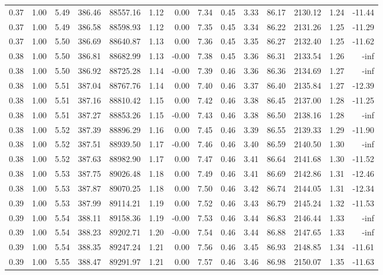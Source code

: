 \begin{table}[!ht]
\begin{tabular}{rrrrrrrrrrrrrr}
0.37 & 1.00 & 5.49 & 386.46 & 88557.16 & 1.12 & 0.00 & 7.34 & 0.45 & 3.33 & 86.17 & 2130.12 & 1.24 & -11.44 \\
0.37 & 1.00 & 5.49 & 386.58 & 88598.93 & 1.12 & 0.00 & 7.35 & 0.45 & 3.34 & 86.22 & 2131.26 & 1.25 & -11.29 \\
0.37 & 1.00 & 5.50 & 386.69 & 88640.87 & 1.13 & 0.00 & 7.36 & 0.45 & 3.35 & 86.27 & 2132.40 & 1.25 & -11.62 \\
0.38 & 1.00 & 5.50 & 386.81 & 88682.99 & 1.13 & -0.00 & 7.38 & 0.45 & 3.36 & 86.31 & 2133.54 & 1.26 & -inf \\
0.38 & 1.00 & 5.50 & 386.92 & 88725.28 & 1.14 & -0.00 & 7.39 & 0.46 & 3.36 & 86.36 & 2134.69 & 1.27 & -inf \\
0.38 & 1.00 & 5.51 & 387.04 & 88767.76 & 1.14 & 0.00 & 7.40 & 0.46 & 3.37 & 86.40 & 2135.84 & 1.27 & -12.39 \\
0.38 & 1.00 & 5.51 & 387.16 & 88810.42 & 1.15 & 0.00 & 7.42 & 0.46 & 3.38 & 86.45 & 2137.00 & 1.28 & -11.25 \\
0.38 & 1.00 & 5.51 & 387.27 & 88853.26 & 1.15 & -0.00 & 7.43 & 0.46 & 3.38 & 86.50 & 2138.16 & 1.28 & -inf \\
0.38 & 1.00 & 5.52 & 387.39 & 88896.29 & 1.16 & 0.00 & 7.45 & 0.46 & 3.39 & 86.55 & 2139.33 & 1.29 & -11.90 \\
0.38 & 1.00 & 5.52 & 387.51 & 88939.50 & 1.17 & -0.00 & 7.46 & 0.46 & 3.40 & 86.59 & 2140.50 & 1.30 & -inf \\
0.38 & 1.00 & 5.52 & 387.63 & 88982.90 & 1.17 & 0.00 & 7.47 & 0.46 & 3.41 & 86.64 & 2141.68 & 1.30 & -11.52 \\
0.38 & 1.00 & 5.53 & 387.75 & 89026.48 & 1.18 & 0.00 & 7.49 & 0.46 & 3.41 & 86.69 & 2142.86 & 1.31 & -12.46 \\
0.38 & 1.00 & 5.53 & 387.87 & 89070.25 & 1.18 & 0.00 & 7.50 & 0.46 & 3.42 & 86.74 & 2144.05 & 1.31 & -12.34 \\
0.39 & 1.00 & 5.53 & 387.99 & 89114.21 & 1.19 & 0.00 & 7.52 & 0.46 & 3.43 & 86.79 & 2145.24 & 1.32 & -11.53 \\
0.39 & 1.00 & 5.54 & 388.11 & 89158.36 & 1.19 & -0.00 & 7.53 & 0.46 & 3.44 & 86.83 & 2146.44 & 1.33 & -inf \\
0.39 & 1.00 & 5.54 & 388.23 & 89202.71 & 1.20 & -0.00 & 7.54 & 0.46 & 3.44 & 86.88 & 2147.65 & 1.33 & -inf \\
0.39 & 1.00 & 5.54 & 388.35 & 89247.24 & 1.21 & 0.00 & 7.56 & 0.46 & 3.45 & 86.93 & 2148.85 & 1.34 & -11.61 \\
0.39 & 1.00 & 5.55 & 388.47 & 89291.97 & 1.21 & 0.00 & 7.57 & 0.46 & 3.46 & 86.98 & 2150.07 & 1.35 & -11.63 \\

\end{tabular}
\end{table}
